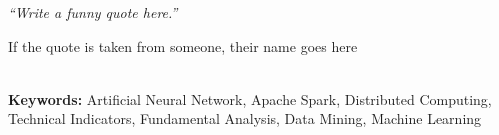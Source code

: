 \documentclass[a4paper, 12pt, oneside]{Thesis}  %
\begin{document}
\null\vfill
\textit{``Write a funny quote here.''}

\begin{flushright}
If the quote is taken from someone, their name goes here
\end{flushright}

\vfill\vfill\vfill\vfill\vfill\vfill\null
\clearpage  %

\\
\smallskip
{\bf Keywords:} Artificial Neural Network, Apache Spark, Distributed Computing, Technical Indicators, Fundamental Analysis, Data Mining, Machine Learning
\clearpage  %


\clearpage  %

\pagestyle{fancy}  %


\tableofcontents  %

\listoffigures  %
\end{document}
